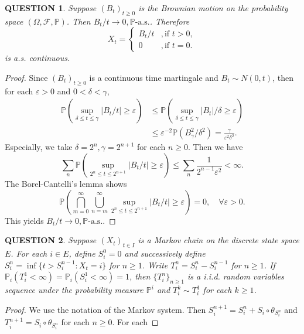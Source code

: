 \documentclass[12pt]{article}
\renewcommand{\(}{\left(}%
\renewcommand{\)}{\right)}%
\renewcommand{\[}{\left[}%
\renewcommand{\]}{\right]}%
\newcommand{\p}{\mathbb{P}}
\newcommand{\f}{\mathscr{F}}
\newtheorem{question}{QUESTION}[section]}
\newtheorem{proof}{Proof.}}
\begin{document}
  \begin{question}
   Suppose $(B_t)_{t\geq 0}$ is the Brownian motion on the probability space $(\Omega,\f,\p )$. Then $B_t/t\to 0,\p\mathrm{\text{-}a.s.}$. Therefore
   \begin{equation*}
    X_t=\begin{cases}
     B_t/t&,\mbox{if }t>0,\\
     0&,\mbox{if }t=0.
    \end{cases}
   \end{equation*}
   is a.s. continuous.
  \end{question}
  \begin{proof}
   Since $(B_t)_{t\geq 0}$ is a continuous time martingale and $B_t\sim N(0,t)$, then for each $\varepsilon>0$ and $0<\delta<\gamma $,
   \begin{equation*}
    \begin{split}
     \p\(\sup_{\delta\leq t\leq \gamma }|B_t/t|\geq \varepsilon \)&\leq \p\( \sup_{\delta\leq t\leq \gamma }|B_t|/\delta\geq \varepsilon \)\\
     &\leq \varepsilon^{-2}\p\(B_\gamma^2/\delta^2\)=\frac{\gamma }{\varepsilon^2\delta^2}.
    \end{split}
   \end{equation*}
   Especially, we take $\delta=2^n,\gamma=2^{n+1}$ for each $n\geq 0$. Then we have
   \begin{equation*}
    \sum_n\p\(\sup_{2^n\leq t\leq 2^{n+1} }|B_t/t|\geq \varepsilon \)\leq \sum_n \frac{1}{2^{n-1}\varepsilon^2}<\infty.
   \end{equation*}
   The {\sffamily Borel-Cantelli's lemma} shows
   \begin{equation*}
    \p\(\bigcap_{m=0}^\infty\bigcup_{n=m}^\infty \sup_{2^n\leq t\leq 2^{n+1} }|B_t/t|\geq \varepsilon\)=0,\quad\forall\varepsilon>0.
   \end{equation*}
   This yields $B_t/t\to 0,\p\mathrm{\text{-}a.s.}$.
  \end{proof}

  \begin{question}
   Suppose $(X_t)_{t\in I}$ is a Markov chain on the discrete state space $E$. For each $i\in E$, define $S_i^0=0$ and successively define $S_i^{n}=\inf\{t>S_{i}^{n-1}:X_t=i\}$ for $n\geq 1$. Write $T_i^n=S_i^n-S_i^{n-1}$ for $n\geq 1$. If $\p_i(T_i^1<\infty)=\p_i(S_i^1<\infty)=1$, then $\{T_i^n\}_{n\geq 1}$ is a i.i.d.\!\!\! random variables sequence under the probability measure $\p^i$ and $T_i^k\sim T_i^1$ for each $k\geq 1$.
  \end{question}
  \begin{proof}
   We use the notation of the Markov system. Then $S_i^{n+1}=S_i^n+S_i\circ\theta_{S_i^n}$ and $T_i^{n+1}=S_i\circ\theta_{S_i^n}$ for each $n\geq 0$. For each
  \end{proof}
\end{document}
